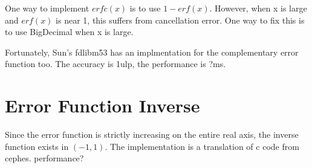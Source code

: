One way to implement $erfc(x)$ is to use $1 - erf(x)$. However, when x is large and $erf(x)$ is near 1, this suffers from cancellation error. One way to fix this is to use BigDecimal when x is large.

Fortunately, Sun's fdlibm53 has an implmentation for the complementary error function too. The accuracy is 1ulp, the performance is ?ms. 


\section{Error Function Inverse}
Since the error function is strictly increasing on the entire real axis, the inverse function exists in $(-1, 1)$. The implementation is a translation of c code from cephes. performance? 



